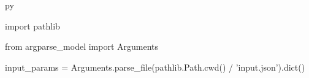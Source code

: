 \begin{pythontexcustomcode}{py}

import pathlib

from argparse_model import Arguments

input_params = Arguments.parse_file(pathlib.Path.cwd() / 'input.json').dict()

\end{pythontexcustomcode}
